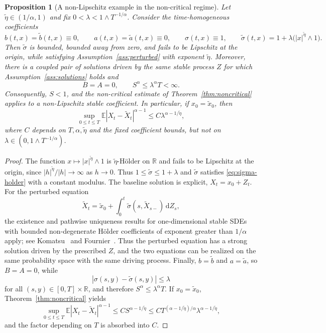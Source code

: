 \documentclass[10pt,a4paper]{amsart}
\newtheorem{proposition}[theorem]{Proposition}
\newcommand{\R}{\mathbb{R}}
\newcommand{\E}{\mathbb{E}}
\newcommand{\1}{\mathbf{1}}
\newcommand{\dd}{\,\mathrm{d}}
\newcommand{\wt}{\tilde}
\begin{document}
\begin{proposition}[A non-Lipschitz example in the non-critical regime]\label{prop:nonlipschitz-example}
Let $\wt\eta\in(1/\alpha,1)$ and fix $0<\lambda<1\wedge T^{-1/\alpha}$. Consider the time-homogeneous coefficients
\[
  b(t,x)=\wt b(t,x)\equiv0,
  \qquad
  a(t,x)=\wt a(t,x)\equiv0,
  \qquad
  \sigma(t,x)\equiv1,
  \qquad
  \wt\sigma(t,x)=1+\lambda\bigl(|x|^{\wt\eta}\wedge1\bigr).
\]
Then $\wt\sigma$ is bounded, bounded away from zero, and fails to be Lipschitz at the origin, while satisfying Assumption~\ref{ass:perturbed} with exponent $\wt\eta$. Moreover, there is a coupled pair of solutions driven by the same stable process $Z$ for which Assumption~\ref{ass:solutions} holds and
\[
  B=A=0,
  \qquad
  S^\alpha\le \lambda^\alpha T<\infty.
\]
Consequently, $S<1$, and the non-critical estimate of Theorem~\ref{thm:noncritical} applies to a non-Lipschitz stable coefficient. In particular, if $x_0=\wt x_0$, then
\[
  \sup_{0\le t\le T}\E|X_t-\wt X_t|^{\alpha-1}
  \le C\lambda^{\alpha-1/\wt\eta},
\]
where $C$ depends on $T,\alpha,\wt\eta$ and the fixed coefficient bounds, but not on $\lambda\in(0,1\wedge T^{-1/\alpha})$.
\end{proposition}

\begin{proof}
The function $x\mapsto |x|^{\wt\eta}\wedge1$ is $\wt\eta$-H\"older on $\R$ and fails to be Lipschitz at the origin, since $|h|^{\wt\eta}/|h|\to\infty$ as $h\to0$. Thus $1\le \wt\sigma\le1+\lambda$ and $\wt\sigma$ satisfies \eqref{eq:sigma-holder} with a constant modulus. The baseline solution is explicit, $X_t=x_0+Z_t$. For the perturbed equation
\[
  \wt X_t=\wt x_0+\int_0^t \wt\sigma(s,\wt X_{s-})\dd Z_s,
\]
the existence and pathwise uniqueness results for one-dimensional stable SDEs with bounded non-degenerate H\"older coefficients of exponent greater than $1/\alpha$ apply; see Komatsu~\cite{Komatsu1982} and Fournier~\cite{Fournier2013}. Thus the perturbed equation has a strong solution driven by the prescribed $Z$, and the two equations can be realized on the same probability space with the same driving process. Finally, $b=\wt b$ and $a=\wt a$, so $B=A=0$, while
\[
  |\sigma(s,y)-\wt\sigma(s,y)|\le \lambda
\]
for all $(s,y)\in[0,T]\times\R$, and therefore $S^\alpha\le \lambda^\alpha T$. If $x_0=\wt x_0$, Theorem~\ref{thm:noncritical} yields
\[
  \sup_{0\le t\le T}\E|X_t-\wt X_t|^{\alpha-1}
  \le C S^{\alpha-1/\wt\eta}
  \le C T^{(\alpha-1/\wt\eta)/\alpha}\lambda^{\alpha-1/\wt\eta},
\]
and the factor depending on $T$ is absorbed into $C$.

\end{proof}
\end{document}
